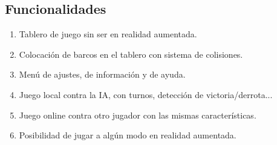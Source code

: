\documentclass[a4paper, openright, 12pt]{article}
\begin{document}
\subsection{Funcionalidades}
\begin{enumerate}
    \item Tablero de juego sin ser en realidad aumentada.
    \item Colocación de barcos en el tablero con sistema de colisiones.
    \item Menú de ajustes, de información y de ayuda.
    \item Juego local contra la IA, con turnos, detección de victoria/derrota...
    \item Juego online contra otro jugador con las mismas características.
    \item Posibilidad de jugar a algún modo en realidad aumentada.
\end{enumerate}
\end{document}
